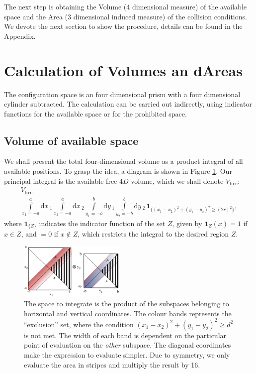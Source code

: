 \documentclass[superscriptaddress,pre,reprint,showpacs,onecolumn]{revtex4-1}
\newcommand{\rd}[1]{\mathrm{d}{#1} \,}
\newcommand{\indicator}[1]{\mathbf{1}_{ \{   #1 \} } }
\begin{document}
The next step is obtaining the Volume (4 dimensional measure) of
the available space and the Area (3 dimensional induced measure) of
the collision conditions. We devote the next section to
show the procedure, details can be found in the Appendix.


\section{Calculation of Volumes an dAreas}

The configuration
space is an four dimensional prism with a four dimensional
cylinder subtracted.
The calculation can be carried out indirectly,
 using indicator functions for the
available space or for the prohibited space.

\subsection{Volume of available space}

We shall present the total four-dimensional volume as a product integral
of all available positions. To grasp the idea, a 
diagram is shown in Figure \ref{diagintegra01}. Our
principal integral is the available free $4D$ volume, which 
we shall denote $V_\text{free}$:
\begin{multline}\label{volindic}
 V_\text{free} = \\ \int\limits_{x_1 = -a}^a \rd x_1 \int\limits_{x_2 = -a}^a \rd x_2 
\int\limits_{y_1 = -b}^b \rd y_1 \int\limits_{y_2 = -b}^b \rd y_2 \, \indicator{ (x_1-x_2)^2 + (y_1-y_2)^2 \ge (2r)^2 },
\end{multline}
where $\indicator{Z}$ indicates the indicator function of the set $Z$, 
given by $\mathbf{1}_Z (x) = 1$ if $x \in Z$, and $=0$ if $x \notin Z$, 
which restricts the integral to the desired region $Z$.
\begin{figure}[h]
  \begin{center}
    \includegraphics[width=0.45\textwidth]{FigurasPerfectas/diagramintegra01.pdf}
  \end{center}
  \caption{The space to integrate is the product of the subspaces
    belonging to horizontal and vertical coordinates. The colour
    bands represents the ``exclusion'' set, where the condition 
    $ (x_1-x_2)^2 + (y_1-y_2)^2 \ge d^2 $ is not met. 
    The width of each band is dependent on the particular 
    point of evaluation
    on the \emph{other} subspace. The diagonal coordinates
    make the expression to evaluate simpler. Due to 
    symmetry, we only evaluate the area in stripes and
    multiply the result by 16.}\label{diagintegra01}  
\end{figure}
\end{document}

